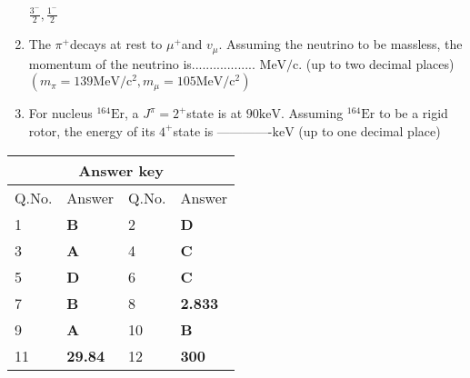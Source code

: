 \begin{enumerate}
\begin{tasks}
		\task[\textbf{D.}] $\frac{3^{-}}{2}, \frac{1^{-}}{2}$
	\end{tasks}
	\item The $\pi^{+}$decays at rest to $\mu^{+}$and $v_{\mu}$. Assuming the neutrino to be massless, the momentum of the neutrino is.................. $\mathrm{MeV} / \mathrm{c}$. (up to two decimal places)\\ $\left(m_{\pi}=139 \mathrm{MeV} / \mathrm{c}^{2}, m_{\mu}=105 \mathrm{MeV} / \mathrm{c}^{2}\right)$
	{}
	\item For nucleus ${ }^{164} \mathrm{Er}$, a $J^{\pi}=2^{+}$state is at $90 \mathrm{keV}$. Assuming ${ }^{164} \mathrm{Er}$ to be a rigid rotor, the energy of its $4^{+}$state is -------------$\mathrm{keV}$ (up to one decimal place)
	{}
\end{enumerate}
\setlength\arrayrulewidth{1pt}
\begin{table}[H]
	\centering
	\begin{tabular}{|p{1.5cm}|p{1.5cm}||p{1.5cm}|p{1.5cm}|}
		\hline
		\multicolumn{4}{|c|}{\textbf{Answer key}}\\\hline\hline
		\rowcolor{ocrel}Q.No.&Answer&Q.No.&Answer\\\hline
		1&\textbf{B} &2&\textbf{D}\\\hline 
		3&\textbf{A} &4&\textbf{C} \\\hline
		5&\textbf{D} &6&\textbf{C} \\\hline
		7&\textbf{B}&8&\textbf{2.833}\\\hline
		9&\textbf{A}&10&\textbf{B}\\\hline
		11&\textbf{29.84} &12&\textbf{300}\\\hline
	\end{tabular}
\end{table}